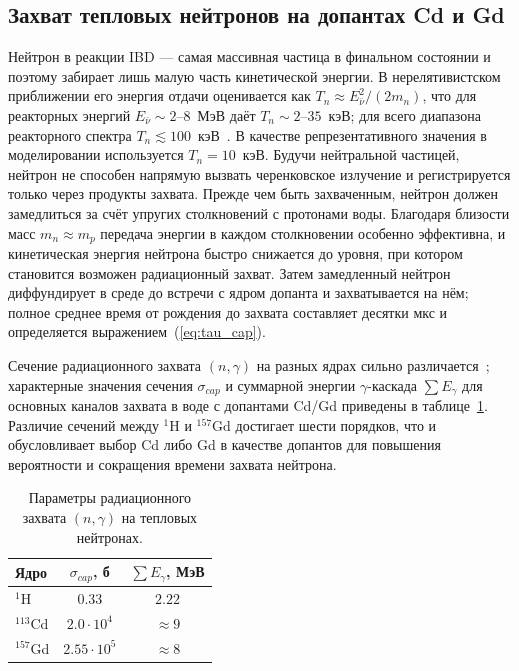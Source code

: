 \documentclass[a4paper,12pt]{extarticle}
\begin{document}
\subsection{Захват тепловых нейтронов на допантах Cd и Gd}
Нейтрон в реакции IBD --- самая массивная частица в финальном состоянии и поэтому забирает лишь малую часть кинетической энергии. В нерелятивистском приближении его энергия отдачи оценивается как $T_n\approx E_{\bar\nu}^2/(2m_n)$, что для реакторных энергий $E_{\bar\nu}\sim 2$--$8$~МэВ даёт $T_n\sim 2$--$35$~кэВ; для всего диапазона реакторного спектра $T_n\lesssim 100$~кэВ~\cite{vogel1999}. В качестве репрезентативного значения в моделировании используется $T_n=10$~кэВ. Будучи нейтральной частицей, нейтрон не способен напрямую вызвать черенковское излучение и регистрируется только через продукты захвата. Прежде чем быть захваченным, нейтрон должен замедлиться за счёт упругих столкновений с протонами воды. Благодаря близости масс $m_n\approx m_p$ передача энергии в каждом столкновении особенно эффективна, и кинетическая энергия нейтрона быстро снижается до уровня, при котором становится возможен радиационный захват. Затем замедленный нейтрон диффундирует в среде до встречи с ядром допанта и захватывается на нём; полное среднее время от рождения до захвата составляет десятки мкс и определяется выражением~(\ref{eq:tau_cap}).

Сечение радиационного захвата $(n,\gamma)$ на разных ядрах сильно различается~\cite{mughabghab2006}; характерные значения сечения $\sigma_{cap}$ и суммарной энергии $\gamma$-каскада $\sum E_\gamma$ для основных каналов захвата в воде с допантами Cd/Gd приведены в таблице~\ref{tab:capture}. Различие сечений между $^{1}\text{H}$ и $^{157}\text{Gd}$ достигает шести порядков, что и обусловливает выбор Cd либо Gd в качестве допантов для повышения вероятности и сокращения времени захвата нейтрона.

\begin{table}[h]
\centering
\caption{Параметры радиационного захвата $(n,\gamma)$ на тепловых нейтронах.}
\label{tab:capture}
\begin{tabular}{lcc}
\toprule
Ядро & $\sigma_{cap}$, б & $\sum E_{\gamma}$, МэВ \\
\midrule
$^{1}$H    & $0.33$              & $2.22$ \\
$^{113}$Cd & $2.0\cdot 10^{4}$   & $\approx 9$ \\
$^{157}$Gd & $2.55\cdot 10^{5}$  & $\approx 8$ \\
\bottomrule
\end{tabular}
\end{table}
\end{document}
